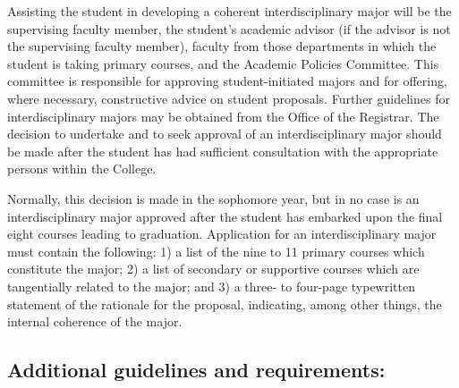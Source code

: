 \documentclass[
  letterpaper,
]{scrbook}
\begin{document}
Assisting the student in developing a coherent interdisciplinary major
will be the supervising faculty member, the student's academic advisor
(if the advisor is not the supervising faculty member), faculty from
those departments in which the student is taking primary courses, and
the Academic Policies Committee. This committee is responsible for
approving student-initiated majors and for offering, where necessary,
constructive advice on student proposals. Further guidelines for
interdisciplinary majors may be obtained from the Office of the
Registrar. The decision to undertake and to seek approval of an
interdisciplinary major should be made after the student has had
sufficient consultation with the appropriate persons within the College.

Normally, this decision is made in the sophomore year, but in no case is
an interdisciplinary major approved after the student has embarked upon
the final eight courses leading to graduation. Application for an
interdisciplinary major must contain the following: 1) a list of the
nine to 11 primary courses which constitute the major; 2) a list of
secondary or supportive courses which are tangentially related to the
major; and 3) a three- to four-page typewritten statement of the
rationale for the proposal, indicating, among other things, the internal
coherence of the major.

\subsection{Additional guidelines and
requirements:}\label{additional-guidelines-and-requirements}
\end{document}
